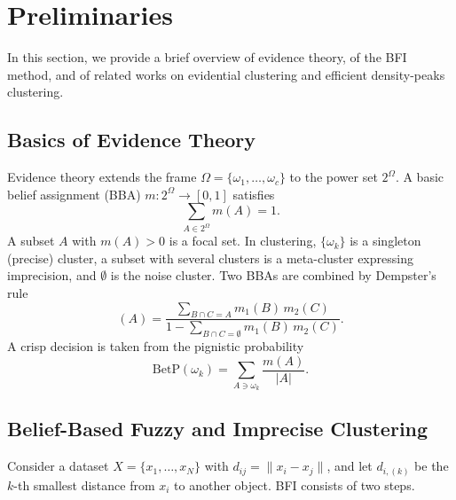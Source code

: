\documentclass[journal]{IEEEtran}
\newcommand{\BetP}{\mathrm{BetP}}
\begin{document}
\section{Preliminaries}\label{sec:prelim}
In this section, we provide a brief overview of evidence theory, of the BFI method, and of related works on evidential clustering and efficient density-peaks clustering.

\subsection{Basics of Evidence Theory}
Evidence theory \cite{dempster1967, shafer1976} extends the frame $\Omega=\{\omega_1,\dots,\omega_c\}$ to the power set $2^\Omega$. A basic belief assignment (BBA) $m:2^\Omega\to[0,1]$ satisfies
\begin{equation}
\sum_{A\in 2^{\Omega}} m(A)=1. \label{eq:bba_norm}
\end{equation}
A subset $A$ with $m(A)>0$ is a focal set. In clustering, $\{\omega_k\}$ is a singleton (precise) cluster, a subset with several clusters is a meta-cluster expressing imprecision, and $\emptyset$ is the noise cluster. Two BBAs are combined by Dempster's rule
\begin{equation}
[m_1\oplus m_2](A)=\frac{\sum_{B\cap C=A} m_1(B)\,m_2(C)}{1-\sum_{B\cap C=\emptyset} m_1(B)\,m_2(C)}. \label{eq:ds}
\end{equation}
A crisp decision is taken from the pignistic probability \cite{smets1990}
\begin{equation}
\BetP(\omega_k)=\sum_{A\ni\omega_k}\frac{m(A)}{|A|}. \label{eq:betp}
\end{equation}

\subsection{Belief-Based Fuzzy and Imprecise Clustering}
Consider a dataset $X=\{x_1,\dots,x_N\}$ with $d_{ij}=\|x_i-x_j\|$, and let $d_{i,(k)}$ be the $k$-th smallest distance from $x_i$ to another object. BFI \cite{zhang2025} consists of two steps.
\end{document}
